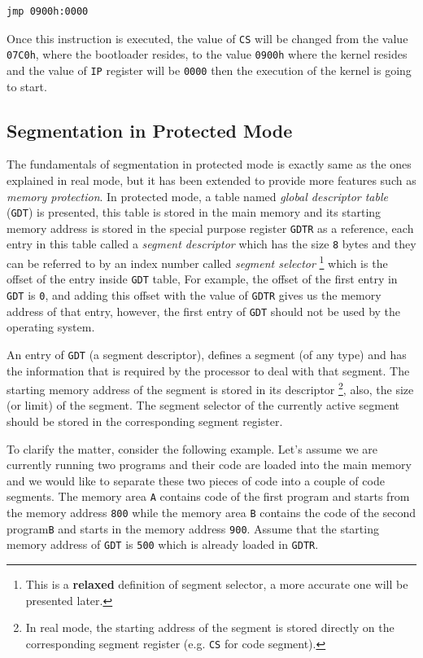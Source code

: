 \begin{lstlisting}
jmp 0900h:0000
\end{lstlisting}

Once this instruction is executed, the value of \lstinline!CS! will be
changed from the value \lstinline!07C0h!, where the bootloader resides,
to the value \lstinline!0900h! where the kernel resides and the value of
\lstinline!IP! register will be \lstinline!0000! then the execution of
the kernel is going to start.

\subsection{Segmentation in Protected
Mode}\label{segmentation-in-protected-mode}

The fundamentals of segmentation in protected mode is exactly same as
the ones explained in real mode, but it has been extended to provide
more features such as \emph{memory protection}. In protected mode, a
table named \emph{global descriptor table} (\lstinline!GDT!) is
presented, this table is stored in the main memory and its starting
memory address is stored in the special purpose register
\lstinline!GDTR! as a reference, each entry in this table called a
\emph{segment descriptor} which has the size \lstinline!8! bytes and
they can be referred to by an index number called \emph{segment
selector} \footnote{This is a \textbf{relaxed} definition of segment
  selector, a more accurate one will be presented later.} which is the
offset of the entry inside \lstinline!GDT! table, For example, the
offset of the first entry in \lstinline!GDT! is \lstinline!0!, and
adding this offset with the value of \lstinline!GDTR! gives us the
memory address of that entry, however, the first entry of
\lstinline!GDT! should not be used by the operating system.

An entry of \lstinline!GDT! (a segment descriptor), defines a segment
(of any type) and has the information that is required by the processor
to deal with that segment. The starting memory address of the segment is
stored in its descriptor \footnote{In real mode, the starting address of
  the segment is stored directly on the corresponding segment register
  (e.g. \lstinline!CS! for code segment).}, also, the size (or limit) of
the segment. The segment selector of the currently active segment should
be stored in the corresponding segment register.

To clarify the matter, consider the following example. Let's assume we
are currently running two programs and their code are loaded into the
main memory and we would like to separate these two pieces of code into
a couple of code segments. The memory area \lstinline!A! contains code
of the first program and starts from the memory address \lstinline!800!
while the memory area \lstinline!B! contains the code of the second
program\lstinline!B! and starts in the memory address \lstinline!900!.
Assume that the starting memory address of \lstinline!GDT! is
\lstinline!500! which is already loaded in \lstinline!GDTR!.

